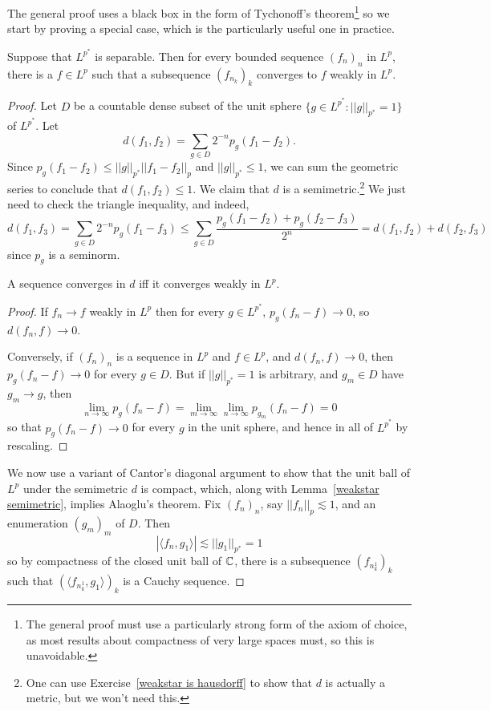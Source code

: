 The general proof uses a black box in the form of Tychonoff's theorem\footnote{The general proof must use a particularly strong form of the axiom of choice, as most results about compactness of very large spaces must, so this is unavoidable.} so we start by proving a special case, which is the particularly useful one in practice.

\begin{theorem}
Suppose that $L^{p^*}$ is separable. Then for every bounded sequence $(f_{n})_{n}$ in $L^p$, there is a $f \in L^p$ such that a subsequence $(f_{n_{k}})_{k}$ converges to $f$ weakly in $L^p$.
\end{theorem}
\begin{proof}
Let $D$ be a countable dense subset of the unit sphere $\{g \in L^{p^*}: ||g||_{p^*} = 1\}$ of $L^{p^*}$.
Let
\[d(f_1, f_2) = \sum_{g \in D} 2^{-n} p_g(f_1 - f_2).\]
Since $p_g(f_1 - f_2) \leq ||g||_{p^*} ||f_1 - f_2||_{p} $ and $||g||_{p^*} \leq 1$, we can sum the geometric series to conclude that $d(f_1, f_2) \leq 1$.
We claim that $d$ is a semimetric.\footnote{One can use Exercise~\ref{weakstar is hausdorff} to show that $d$ is actually a metric, but we won't need this.}
We just need to check the triangle inequality, and indeed,
\[d(f_1, f_3) = \sum_{g \in D} 2^{-n} p_g(f_1 - f_3) \leq \sum_{g \in D} \frac{p_g(f_1 - f_2) + p_g(f_2 - f_3)}{2^n} = d(f_1, f_2) + d(f_2, f_3)\]
since $p_g$ is a seminorm.

\begin{lemma}
\label{weakstar semimetric}
A sequence converges in $d$ iff it converges weakly in $L^p$.
\end{lemma}
\begin{proof}
If $f_{n} \to f$ weakly in $L^p$ then for every $g \in L^{p^*}$, $p_g(f_{n} - f) \to 0$, so $d(f_{n}, f) \to 0$.

Conversely, if $(f_{n})_{n}$ is a sequence in $L^p$ and $f \in L^p$, and $d(f_{n}, f) \to 0$, then $p_g(f_{n} - f) \to 0$ for every $g \in D$.
But if $||g||_{p^*} = 1$ is arbitrary, and $g_{m} \in D$ have $g_{m} \to g$, then
\[\lim_{n \to \infty} p_g(f_{n} - f) = \lim_{m \to \infty} \lim_{n \to \infty} p_{g_{m}}(f_{n} - f) = 0\]
so that $p_g(f_{n} - f) \to 0$ for every $g$ in the unit sphere, and hence in all of $L^{p^*}$ by rescaling.
\end{proof}

We now use a variant of Cantor's diagonal argument to show that the unit ball of $L^p$ under the semimetric $d$ is compact, which, along with Lemma~\ref{weakstar semimetric}, implies Alaoglu's theorem.
Fix $(f_{n})_{n}$, say $||f_{n}||_{p}  \lesssim 1$, and an enumeration $(g_{m})_{m}$ of $D$.
Then
\[|\langle f_{n}, g_1\rangle| \lesssim ||g_1||_{p^*} = 1\]
so by compactness of the closed unit ball of $\mathbb{C}$, there is a subsequence $(f_{n_{k}^1})_{k}$ such that $(\langle f_{n_{k}^1}, g_1\rangle)_{k}$ is a Cauchy sequence.


\end{proof}
